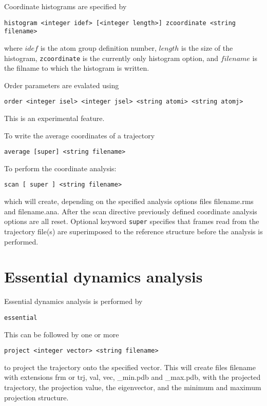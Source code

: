 Coordinate histograms are specified by

\begin{verbatim}
histogram <integer idef> [<integer length>] zcoordinate <string filename>
\end{verbatim}

where $idef$ is the atom group definition number, $length$ is the size
of the histogram, \verb+zcoordinate+ is the currently only histogram option,
and $filename$ is the filname to which the histogram is written.

Order parameters are evalated using

\begin{verbatim}
order <integer isel> <integer jsel> <string atomi> <string atomj>
\end{verbatim}
This is an experimental feature.

To write the average coordinates of a trajectory

\begin{verbatim}
average [super] <string filename>
\end{verbatim}


To perform the coordinate analysis:

\begin{verbatim}
scan [ super ] <string filename>
\end{verbatim}

which will create, depending on the specified analysis options
files filename.rms and filename.ana. After the scan directive
previously defined coordinate analysis options are all reset.
Optional keyword \verb+super+ specifies that frames read from
the trajectory file(s) are superimposed to the reference structure
before the analysis is performed.

\section{Essential dynamics analysis}

Essential dynamics analysis is performed by

\begin{verbatim}
essential
\end{verbatim}

This can be followed by one or more

\begin{verbatim}
project <integer vector> <string filename>
\end{verbatim}

to project the trajectory onto the specified vector. This will
create files filename with extensions frm or trj, val, vec, \_min.pdb
and \_max.pdb, with the projected trajectory, the projection
value, the eigenvector, and the minimum and maximum projection
structure.

